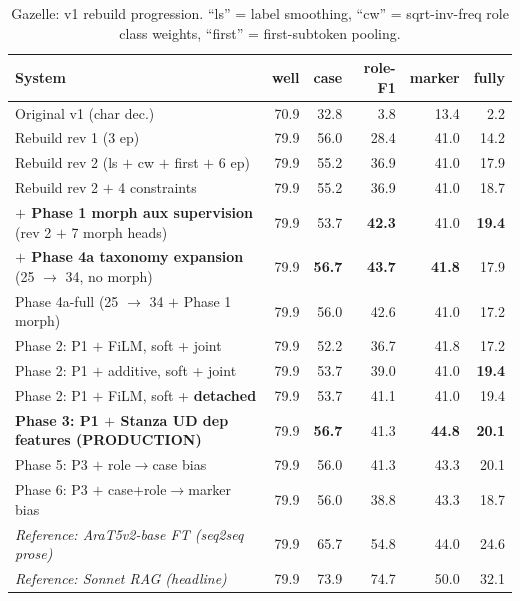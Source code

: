 \documentclass[10pt,a4paper,twocolumn]{article}
\begin{document}
\begin{table}[t]
\centering\small
\caption{Gazelle: v1 rebuild progression. ``ls'' = label smoothing, ``cw'' = sqrt-inv-freq role class weights, ``first'' = first-subtoken pooling.}
\label{tab:rebuild}
\begin{tabular}{lrrrrr}
\toprule
\textbf{System} & \textbf{well} & \textbf{case} & \textbf{role-F1} & \textbf{marker} & \textbf{fully} \\
\midrule
Original v1 (char dec.) & 70.9 & 32.8 & 3.8 & 13.4 & 2.2 \\
Rebuild rev 1 (3 ep) & 79.9 & 56.0 & 28.4 & 41.0 & 14.2 \\
Rebuild rev 2 (ls $+$ cw $+$ first $+$ 6 ep) & 79.9 & 55.2 & 36.9 & 41.0 & 17.9 \\
Rebuild rev 2 $+$ 4 constraints & 79.9 & 55.2 & 36.9 & 41.0 & 18.7 \\
\midrule
\textbf{$+$ Phase 1 morph aux supervision} (rev 2 $+$ 7 morph heads) & 79.9 & 53.7 & \textbf{42.3} & 41.0 & \textbf{19.4} \\
\textbf{$+$ Phase 4a taxonomy expansion} (25 $\rightarrow$ 34, no morph) & 79.9 & \textbf{56.7} & \textbf{43.7} & \textbf{41.8} & 17.9 \\
Phase 4a-full (25 $\rightarrow$ 34 $+$ Phase 1 morph) & 79.9 & 56.0 & 42.6 & 41.0 & 17.2 \\
Phase 2: P1 $+$ FiLM, soft + joint & 79.9 & 52.2 & 36.7 & 41.8 & 17.2 \\
Phase 2: P1 $+$ additive, soft + joint & 79.9 & 53.7 & 39.0 & 41.0 & \textbf{19.4} \\
Phase 2: P1 $+$ FiLM, soft + \textbf{detached} & 79.9 & 53.7 & 41.1 & 41.0 & 19.4 \\
\textbf{Phase 3: P1 $+$ Stanza UD dep features (PRODUCTION)} & 79.9 & \textbf{56.7} & 41.3 & \textbf{44.8} & \textbf{20.1} \\
Phase 5: P3 $+$ role$\rightarrow$case bias & 79.9 & 56.0 & 41.3 & 43.3 & 20.1 \\
Phase 6: P3 $+$ case+role$\rightarrow$marker bias & 79.9 & 56.0 & 38.8 & 43.3 & 18.7 \\
\midrule
\emph{Reference: AraT5v2-base FT (seq2seq prose)} & 79.9 & 65.7 & 54.8 & 44.0 & 24.6 \\
\emph{Reference: Sonnet RAG (headline)} & 79.9 & 73.9 & 74.7 & 50.0 & 32.1 \\
\bottomrule
\end{tabular}
\end{table}
\end{document}

